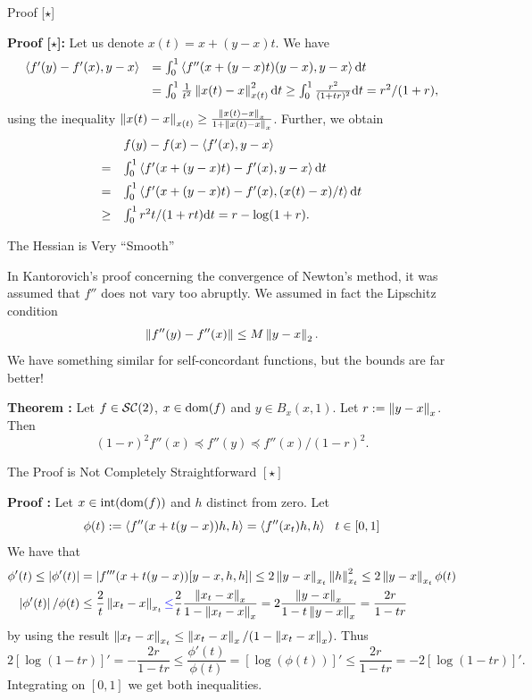 \documentclass[9pt]{beamer}
\begin{document}
\begin{frame}{Proof [$\star$]}

  \textbf{Proof [$\star$]:} Let us denote $x(t)=x+(y-x)t$. We have
  \[
    \begin{array}{rl}
      \left<f'(y)-f'(x),  y-x\right> & = \int_0^1 \left<f''(x+(y-x)t)(y-x), y-x\right>{\mathrm{d}} t\\[0.5em]
                                & = \int_0^1 \frac{1}{t^2} \left\|x(t)-x\right\|_{x(t)}^2{\mathrm{d}} t\geq \int_0^1 \frac{r^2}{(1+tr)^2} {\mathrm{d}} t = r^2/(1+r),
    \end{array}
  \]
  using the inequality $\left\|x(t)-x\right\|_{x(t)}\geq \frac{\left\|x(t)-x\right\|_{x}}{1+\left\|x(t)-x\right\|_{x}}$.
  Further, we obtain
  \[
    \begin{array}{rl}
      & f(y) - f(x) - \left<f'(x),  y-x\right>\\[0.5em]
      = &  \int_0^1 \left<f'(x+(y-x)t)-f'(x),  y-x\right>{\mathrm{d}} t\\[0.5em]
      = &\int_0^1 \left<f'(x+(y-x)t)-f'(x),  (x(t)-x)/t\right> {\mathrm{d}} t\\[0.5em]
      \geq & \int_0^1 r^2t/(1+rt){\mathrm{d}} t = r-\log(1+r).
    \end{array}
  \]

  
\end{frame}

\begin{frame}{The Hessian is Very ``Smooth''}

  In Kantorovich's proof concerning the convergence of Newton's method, it was assumed that $f''$ does not vary too abruptly. We assumed in fact the Lipschitz condition
  \[
    \left\|f''(y) -f''(x)\right\| \leq M \left\|y-x\right\|_2.
  \]
  We have something similar for self-concordant functions, but the bounds are far better!

  \vfill

  \textbf{Theorem :} Let $f\in \mathcal{SC}(2)$, $x \in \operatorname{dom}(f)$ and $y \in B_x(x, 1)$. Let $r:=\left\|y-x\right\|_x$. Then
  \[
    (1-r)^2 f''(x) \preceq f''(y) \preceq f''(x)/(1-r)^2.
  \]
  
\end{frame}


\begin{frame}{The Proof is Not Completely Straightforward $[\star]$}


  \textbf{Proof :} Let $x \in \operatorname{int}(\operatorname{dom}(f))$ and $h$ distinct from zero. Let
  \[
     \phi(t) := \left<f''(x+t(y-x))h, h\right> = \left<f''(x_t)h, h\right> ~~t\in [0,1]
  \]
  We have that
  \[
    \begin{aligned}
      \phi'(t) \leq \left|\phi'(t)\right| & = \left|f'''(x+t(y-x))[y-x, h, h]\right| \leq 2 \left\|y-x\right\|_{x_t} \left\|h\right\|_{x_t}^2 \leq 2 \left\|y-x\right\|_{x_t} \phi(t)\\
      \left|\phi'(t)\right|/\phi(t) & \leq \frac 2t \left\|x_t-x\right\|_{x_t} {\color{blue} \leq} \frac2t \frac{\left\|x_t-x\right\|_x}{1-\left\|x_t-x\right\|_x} = 2\frac{\left\|y-x\right\|_x}{1-t\left\|y-x\right\|_x} = \frac{2r}{1-tr}
    \end{aligned}
  \]
  by using the result $\left\|x_t-x\right\|_{x_t}\leq \left\|x_t-x\right\|_x/(1-\left\|x_t-x\right\|_x)$. 
  Thus
  \[
    2[\log(1-tr)]' = -\frac{2 r}{1-tr} \leq \frac{\phi'(t)}{\phi(t)} = [\log(\phi(t))]'\leq \frac{2 r}{1-tr} = -2[\log(1-tr)]'.
  \]
  Integrating on $[0, 1]$ we get both inequalities. 
\end{frame}
\end{document}
